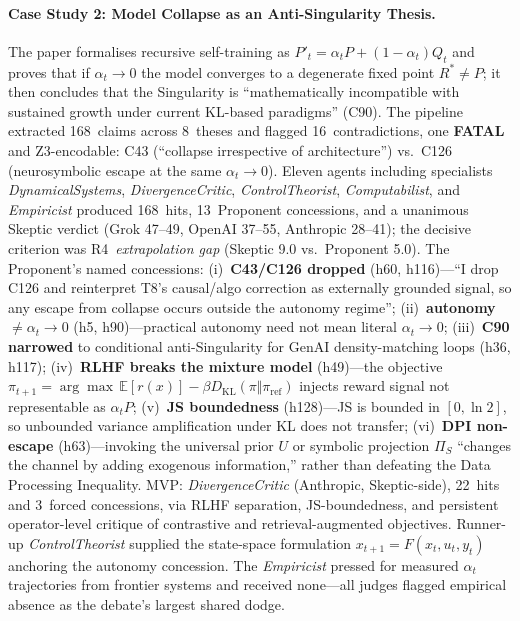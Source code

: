 \documentclass[11pt]{article}
\begin{document}
\paragraph{Case Study 2: Model Collapse as an Anti-Singularity Thesis.}
\label{sec:case_collapse}
The paper formalises recursive self-training as $P'_t = \alpha_t P + (1-\alpha_t) Q_t$ and proves that if $\alpha_t \to 0$ the model converges to a degenerate fixed point $R^* \neq P$; it then concludes that the Singularity is ``mathematically incompatible with sustained growth under current KL-based paradigms'' (C90). The pipeline extracted 168~claims across 8~theses and flagged 16~contradictions, one \textbf{FATAL} and Z3-encodable: C43 (``collapse irrespective of architecture'') vs.\ C126 (neurosymbolic escape at the same $\alpha_t \to 0$). Eleven agents including specialists \emph{DynamicalSystems}, \emph{DivergenceCritic}, \emph{ControlTheorist}, \emph{Computabilist}, and \emph{Empiricist} produced 168~hits, 13~Proponent concessions, and a unanimous Skeptic verdict (Grok 47--49, OpenAI 37--55, Anthropic 28--41); the decisive criterion was R4~\emph{extrapolation gap} (Skeptic 9.0 vs.\ Proponent 5.0). The Proponent's named concessions: (i)~\textbf{C43/C126 dropped} (h60, h116)---``I drop C126 and reinterpret T8's causal/algo correction as externally grounded signal, so any escape from collapse occurs outside the autonomy regime''; (ii)~\textbf{autonomy $\neq \alpha_t \to 0$} (h5, h90)---practical autonomy need not mean literal $\alpha_t \to 0$; (iii)~\textbf{C90 narrowed} to conditional anti-Singularity for GenAI density-matching loops (h36, h117); (iv)~\textbf{RLHF breaks the mixture model} (h49)---the objective $\pi_{t+1} = \arg\max\,\mathbb{E}[r(x)] - \beta D_{\mathrm{KL}}(\pi \Vert \pi_{\mathrm{ref}})$ injects reward signal not representable as $\alpha_t P$; (v)~\textbf{JS boundedness} (h128)---JS is bounded in $[0,\ln 2]$, so unbounded variance amplification under KL does not transfer; (vi)~\textbf{DPI non-escape} (h63)---invoking the universal prior $U$ or symbolic projection $\Pi_S$ ``changes the channel by adding exogenous information,'' rather than defeating the Data Processing Inequality. MVP: \emph{DivergenceCritic} (Anthropic, Skeptic-side), 22~hits and 3~forced concessions, via RLHF separation, JS-boundedness, and persistent operator-level critique of contrastive and retrieval-augmented objectives. Runner-up \emph{ControlTheorist} supplied the state-space formulation $x_{t+1} = F(x_t, u_t, y_t)$ anchoring the autonomy concession. The \emph{Empiricist} pressed for measured $\alpha_t$ trajectories from frontier systems and received none---all judges flagged empirical absence as the debate's largest shared dodge.
\end{document}
